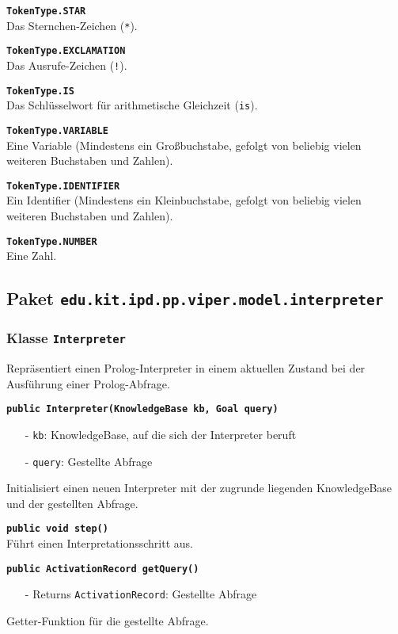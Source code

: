 \documentclass[parskip=full,11pt,twoside]{scrartcl}
\begin{document}
\textbf{\texttt{TokenType.STAR}}\\
Das Sternchen-Zeichen (\texttt{*}).

\textbf{\texttt{TokenType.EXCLAMATION}}\\
Das Ausrufe-Zeichen (\texttt{!}).

\textbf{\texttt{TokenType.IS}}\\
Das Schlüsselwort für arithmetische Gleichzeit (\texttt{is}).

\textbf{\texttt{TokenType.VARIABLE}}\\
Eine Variable (Mindestens ein Großbuchstabe, gefolgt von beliebig vielen weiteren Buchstaben und Zahlen).

\textbf{\texttt{TokenType.IDENTIFIER}}\\
Ein Identifier (Mindestens ein Kleinbuchstabe, gefolgt von beliebig vielen weiteren Buchstaben und Zahlen).

\textbf{\texttt{TokenType.NUMBER}}\\
Eine Zahl.

\newpage
\subsection{Paket \texttt{edu.kit.ipd.pp.viper.model.interpreter}}

\subsubsection{Klasse \texttt{Interpreter}}
Repräsentiert einen Prolog-Interpreter in einem aktuellen Zustand bei der Ausführung einer Prolog-Abfrage.

\textbf{\texttt{public Interpreter(KnowledgeBase kb, Goal query)}}
\begin{itemize}[noitemsep]
	\item[-] \texttt{kb}: KnowledgeBase, auf die sich der Interpreter beruft
	\item[-] \texttt{query}: Gestellte Abfrage
\end{itemize}
Initialisiert einen neuen Interpreter mit der zugrunde liegenden KnowledgeBase und der gestellten Abfrage.

\textbf{\texttt{public void step()}}\\
Führt einen Interpretationsschritt aus.

\textbf{\texttt{public ActivationRecord getQuery()}}
\begin{itemize}[noitemsep]
	\item[-] Returns \texttt{ActivationRecord}: Gestellte Abfrage
\end{itemize}
Getter-Funktion für die gestellte Abfrage.
\end{document}
